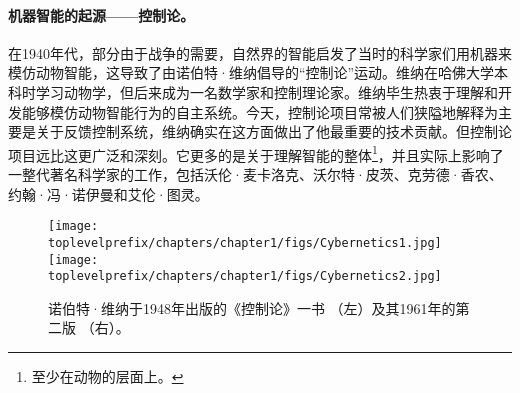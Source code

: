 \documentclass[../../book-main_zh.tex]{subfiles}
\begin{document}



\paragraph{机器智能的起源——控制论。}
在1940年代，部分由于战争的需要，自然界的智能启发了当时的科学家们用机器来模仿动物智能，这导致了由诺伯特·维纳倡导的“控制论”运动。维纳在哈佛大学本科时学习动物学，但后来成为一名数学家和控制理论家。维纳毕生热衷于理解和开发能够模仿动物智能行为的自主系统。今天，控制论项目常被人们狭隘地解释为主要是关于反馈控制系统，维纳确实在这方面做出了他最重要的技术贡献。但控制论项目远比这更广泛和深刻。它更多的是关于理解智能的整体\footnote{至少在动物的层面上。}，并且实际上影响了一整代著名科学家的工作，包括沃伦·麦卡洛克、沃尔特·皮茨、克劳德·香农、约翰·冯·诺伊曼和艾伦·图灵。

\begin{figure}
    \centering
    \texttt{[image: \\toplevelprefix/chapters/chapter1/figs/Cybernetics1.jpg]}
    \hspace{10mm} \texttt{[image: \\toplevelprefix/chapters/chapter1/figs/Cybernetics2.jpg]}
    \caption{诺伯特·维纳于1948年出版的《控制论》一书 \cite{Wiener-Cybernetics-1948}（左）及其1961年的第二版 \cite{Wiener-Cybernetics-1961}（右）。}
    \label{fig:cybernetcis}
\end{figure}
\end{document}

